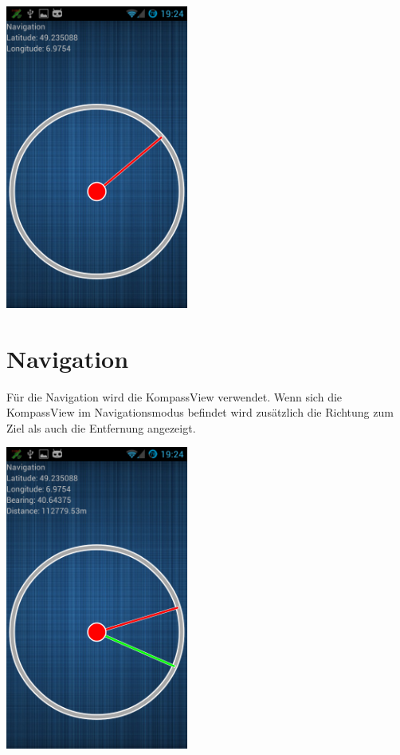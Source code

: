 \begin{capfigure}
	\includegraphics[width=6cm]{images/app/compass}
\end{capfigure}
\clearpage
\section{Navigation}
Für die Navigation wird die KompassView verwendet. Wenn sich die KompassView im Navigationsmodus befindet wird zusätzlich die Richtung zum Ziel als auch die Entfernung angezeigt.

\begin{capfigure}
	\includegraphics[width=6cm]{images/app/navigation}
\end{capfigure}

